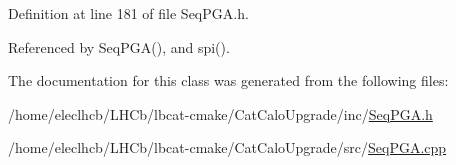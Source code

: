 Definition at line 181 of file Seq\+P\+G\+A.\+h.



Referenced by Seq\+P\+G\+A(), and spi().



The documentation for this class was generated from the following files\+:\begin{DoxyCompactItemize}
\item 
/home/eleclhcb/\+L\+H\+Cb/lbcat-\/cmake/\+Cat\+Calo\+Upgrade/inc/\hyperlink{SeqPGA_8h}{Seq\+P\+G\+A.\+h}\item 
/home/eleclhcb/\+L\+H\+Cb/lbcat-\/cmake/\+Cat\+Calo\+Upgrade/src/\hyperlink{SeqPGA_8cpp}{Seq\+P\+G\+A.\+cpp}\end{DoxyCompactItemize}
